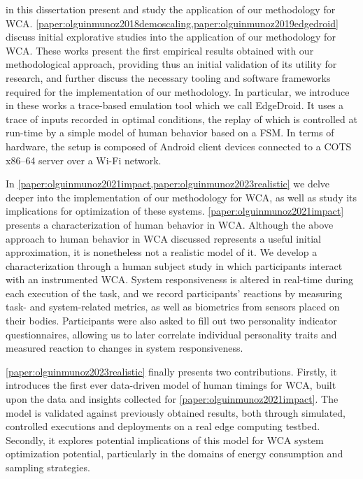 \medskip

 in this dissertation present and study the application of our methodology for \gls{WCA}.
\cref{paper:olguinmunoz2018demoscaling,paper:olguinmunoz2019edgedroid} discuss initial explorative studies into the application of our methodology for \gls{WCA}.
These works present the first empirical results obtained with our methodological approach, providing thus an initial validation of its utility for research, and further discuss the necessary tooling and software frameworks required for the implementation of our methodology.
In particular, we introduce in these works a trace-based emulation tool which we call EdgeDroid.
It uses a trace of inputs recorded in optimal conditions, the replay of which is controlled at run-time by a simple model of human behavior based on a \gls{FSM}.
In terms of hardware, the setup is composed of Android client devices connected to a \gls{COTS} {x86--64} server over a Wi-Fi network.

In \cref{paper:olguinmunoz2021impact,paper:olguinmunoz2023realistic} we delve deeper into the implementation of our methodology for \gls{WCA}, as well as study its implications for optimization of these systems.
\cref{paper:olguinmunoz2021impact} presents a characterization of human behavior in \gls{WCA}.
Although the above approach to human behavior in \gls{WCA} discussed represents a useful initial approximation, it is nonetheless not a realistic model of it.
We develop a characterization through a human subject study in which participants interact with an instrumented \gls{WCA}.
System responsiveness is altered in real-time during each execution of the task, and we record participants' reactions by measuring task- and system-related metrics, as well as biometrics from sensors placed on their bodies.
Participants were also asked to fill out two personality indicator questionnaires, allowing us to later correlate individual personality traits and measured reaction to changes in system responsiveness.

\cref{paper:olguinmunoz2023realistic} finally presents two contributions.
Firstly, it introduces the first ever data-driven model of human timings for \gls{WCA}, built upon the data and insights collected for \cref{paper:olguinmunoz2021impact}.
The model is validated against previously obtained results, both through simulated, controlled executions and deployments on a real edge computing testbed.
Secondly, it explores potential implications of this model for \gls{WCA} system optimization potential, particularly in the domains of energy consumption and sampling strategies.

